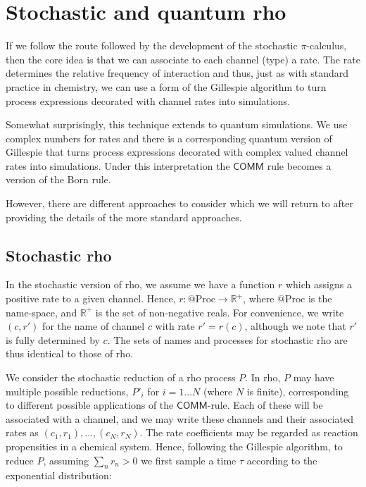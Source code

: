 \section{Stochastic and quantum rho}

If we follow the route followed by the development of the stochastic
$\pi$-calculus, then the core idea is that we can associate to each
channel (type) a rate. The rate determines the relative frequency of
interaction and thus, just as with standard practice in chemistry, we
can use a form of the Gillespie algorithm to turn process expressions
decorated with channel rates into simulations.

Somewhat surprisingly, this technique extends to quantum
simulations. We use complex numbers for rates and there is a
corresponding quantum version of Gillespie that turns process
expressions decorated with complex valued channel rates into
simulations. Under this interpretation the $\mathsf{COMM}$ rule becomes
a version of the Born rule.

However, there are different approaches to consider which we will
return to after providing the details of the more standard approaches.

\subsection{Stochastic rho}

In the stochastic version of rho, we assume we have a function $r$ which assigns a positive rate to a given channel.  Hence, $r: @\text{Proc} \rightarrow \mathbb{R}^+$, where $@\text{Proc}$ is the name-space, and $\mathbb{R}^+$ is the set of non-negative reals.  For convenience, we write $(c,r')$ for the name of channel $c$ with rate $r'=r(c)$, although we note that $r'$ is fully determined by $c$.  The sets of names and processes for stochastic rho are thus identical to those of rho.

We consider the stochastic reduction of a rho process $P$.  In rho, $P$ may have multiple possible reductions, $P'_i$ for $i=1...N$ (where $N$ is finite), corresponding to different possible applications of the $\mathsf{COMM}$-rule.  Each of these will be associated with a channel, and we may write these channels and their associated rates as $(c_1,r_1),...,(c_N,r_N)$.  The rate coefficients may be regarded as reaction propensities in a chemical system.  Hence, following the Gillespie algorithm, to reduce $P$, assuming $\sum_n r_n > 0$ we first sample a time $\tau$ according to the exponential distribution:


